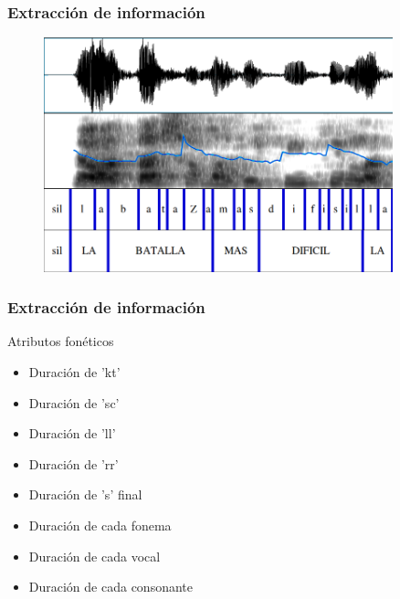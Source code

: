 \documentclass[mathserif]{beamer}%
\begin{document}
\begin{frame}
	\frametitle{Extracción de información}
	
	\begin{figure}[h!]
		\centerline{\includegraphics[width=0.9\textwidth]{espectograma_u3_t33_a1} }
	\end{figure}
\end{frame}

\begin{frame}
	\frametitle{Extracción de información}
	\Large {Atributos fonéticos}
	
	\begin{itemize}
		\item Duración de 'kt'
		\item Duración de 'sc'
		\item Duración de 'll'
		\item Duración de 'rr'
		\item Duración de 's' final
		\item Duración de cada fonema
		\item Duración de cada vocal 
		\item Duración de cada consonante
	\end{itemize}
\end{frame}
\end{document}
